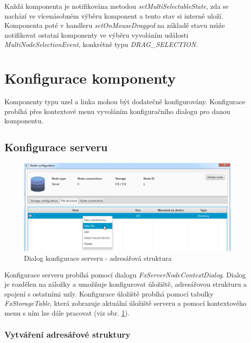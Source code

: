 \documentclass[czech,DP]{thesiskiv}
\begin{document}
Každá komponenta je notifikována metodou \textit{setMultiSelectableState}, zda se nachází ve vícenásobném výběru komponent a tento stav si interně uloží. Komponenta poté v handleru \textit{setOnMouseDragged} na základě stavu může notifikovat ostatní komponenty ve výběru vyvoláním události \textit{MultiNodeSelectionEvent}, konkrétně typu \textit{DRAG\_SELECTION}.

\section{Konfigurace komponenty}

Komponenty typu uzel a linka mohou být dodatečně konfigurovány. Konfigurace probíhá přes kontextové menu vyvoláním konfiguračního dialogu pro danou komponentu.

\subsection{Konfigurace serveru}

\begin{figure}
\centering
	\includegraphics[width=\textwidth]{img/konfig_server.png}
\caption{Dialog konfigurace serveru - adresářová struktura}
\label{fig:server_konfigurace}
\end{figure}

Konfigurace serveru probíhá pomocí dialogu \textit{FxServerNodeContextDialog}. Dialog je rozdělen na záložky a umožňuje konfigurovat úložiště, adresářovou strukturu a spojení s ostatními uzly. Konfigurace úložiště probíhá pomocí tabulky \textit{FxStorageTable}, která zobrazuje aktuální úložiště serveru a pomocí kontextového menu s ním lze dále pracovat (viz obr. \ref{fig:server_konfigurace}).

\subsubsection*{Vytváření adresářové struktury}
\end{document}
